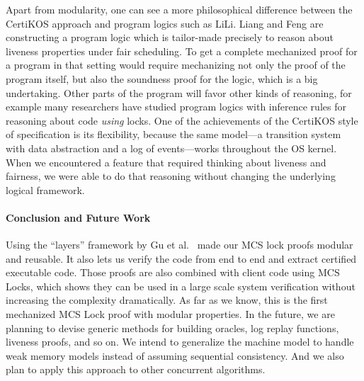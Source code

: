 Apart from modularity, one can see a more philosophical difference
between the CertiKOS approach and program logics such as LiLi.  Liang
and Feng are constructing a program logic which is tailor-made
precisely to reason about liveness properties under fair
scheduling. To get a complete mechanized proof for a program in that
setting would require mechanizing not only the proof of the program
itself, but also the soundness proof for the logic, which is a big
undertaking. Other parts of the program will favor other kinds of
reasoning, for example many researchers have studied program logics
with inference rules for reasoning about code \emph{using} locks. One
of the achievements of the CertiKOS style of specification is its
flexibility, because the same model---a transition system with data
abstraction and a log of events---works throughout the OS kernel. When
we encountered a feature that required thinking about liveness and
fairness, we were able to do that reasoning without changing the
underlying logical framework.

\paragraph{Conclusion and Future Work}
Using the ``layers'' framework by Gu et al.~\cite{dscal15} made our
MCS lock proofs modular and reusable.  It also lets us verify the code
from end to end and extract certified executable code.  Those proofs
are also combined with client code using MCS Locks, which shows they
can be used in a large scale system verification without increasing
the complexity dramatically. As far as we know, this is the
  first mechanized MCS Lock proof with modular properties.  In the
future, we are planning to devise generic methods for building
oracles, log replay functions, liveness proofs, and so on. We intend
to generalize the machine model to handle weak memory models instead
of assuming sequential consistency. And we also plan to apply this
approach to other concurrent algorithms.
